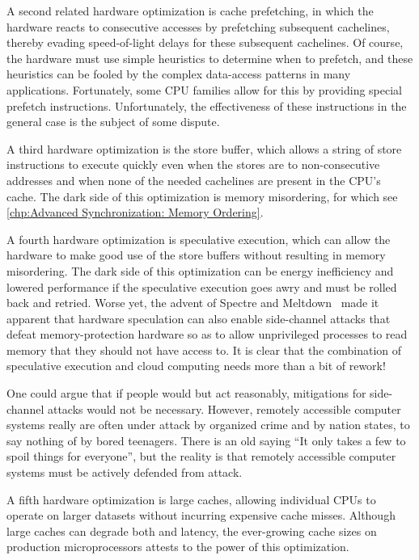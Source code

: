 A second related hardware optimization is cache prefetching, in which
the hardware reacts to consecutive accesses by prefetching subsequent
cachelines, thereby evading speed-of-light delays for these
subsequent cachelines.
Of course, the hardware must use simple heuristics to determine when
to prefetch, and these heuristics can be fooled by the complex data-access
patterns in many applications.
Fortunately, some CPU families allow for this by providing special
prefetch instructions.
Unfortunately, the effectiveness of these instructions in the general
case is the subject of some dispute.

A third hardware optimization is the store buffer, which allows a string
of store instructions to execute quickly even when the stores are to
non-consecutive addresses and when none of the needed cachelines are
present in the CPU's cache.
The dark side of this optimization is memory misordering, for which see
\cref{chp:Advanced Synchronization: Memory Ordering}.

A fourth hardware optimization is speculative execution, which can
allow the hardware to make good use of the store buffers without
resulting in memory misordering.
The dark side of this optimization can be energy inefficiency and
lowered performance if the speculative execution goes awry and must
be rolled back and retried.
Worse yet, the advent of
Spectre and Meltdown~\cite{JannHorn2018MeltdownSpectre}
made it apparent that hardware speculation can also enable side-channel
attacks that defeat memory-protection hardware so as to allow unprivileged
processes to read memory that they should not have access to.
It is clear that the combination of speculative execution and cloud
computing needs more than a bit of rework!

One could argue that if people would but act reasonably, mitigations for
side-channel attacks would not be necessary.
However, remotely accessible computer systems really are often under
attack by organized crime and by nation states, to say nothing of by
bored teenagers.
There is an old saying ``It only takes a few to spoil things for
everyone'', but the reality is that remotely accessible computer systems
must be actively defended from attack.

A fifth hardware optimization is large caches, allowing individual
CPUs to operate on larger datasets without incurring expensive cache
misses.
Although large caches can degrade both  and
 {latency}, the ever-growing cache sizes on production
microprocessors attests to the power of this optimization.

